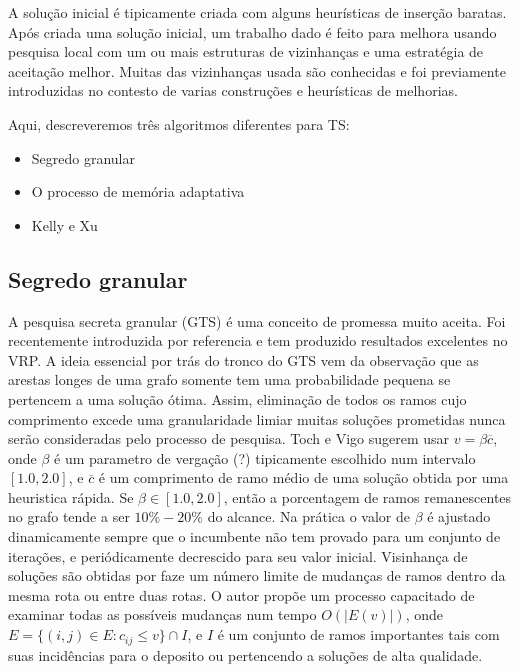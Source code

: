 \documentclass[a4paper, 12pt]{article}
\begin{document}
 A solução inicial é tipicamente criada com alguns heurísticas de inserção baratas. Após criada uma
solução inicial, um trabalho dado é feito para melhora usando pesquisa local com um ou mais
estruturas de vizinhanças e uma estratégia de aceitação melhor. Muitas das vizinhanças usada são
conhecidas e foi previamente introduzidas no contesto de varias construções e heurísticas de
melhorias.

 Aqui, descreveremos três algoritmos diferentes para TS:

\begin{itemize}
\item Segredo granular
\item O processo de memória adaptativa
\item Kelly e Xu
\end{itemize} 

\subsection{Segredo granular}

 A pesquisa secreta granular (GTS) é uma conceito de promessa muito aceita. Foi recentemente
introduzida por {\color{red} referencia} e tem produzido resultados excelentes no VRP. A ideia
essencial por trás do tronco do GTS vem da observação que as arestas longes de uma grafo somente tem
uma probabilidade pequena se pertencem a uma solução ótima. Assim, eliminação de todos os ramos cujo
comprimento excede uma granularidade limiar muitas soluções prometidas nunca serão consideradas pelo
processo de pesquisa. Toch e Vigo sugerem usar $v = \beta \overline{c}$, onde $\beta$ é um parametro
de vergação (?) tipicamente escolhido num intervalo $[1.0, 2.0]$, e $\overline{c}$ é um comprimento
de ramo médio de uma solução obtida por uma heuristica rápida. Se $\beta \in [1.0, 2.0]$, então a
porcentagem de ramos remanescentes no grafo tende a ser $10\%-20\%$ do alcance. Na prática o valor
de $\beta$ é ajustado dinamicamente sempre que o incumbente não tem provado para um conjunto de
iterações, e periódicamente decrescido para seu valor inicial. Visinhança de soluções são obtidas
por faze um número limite de mudanças de ramos dentro da mesma rota ou entre duas rotas. O autor
propõe um processo capacitado de examinar todas as possíveis mudanças num tempo $O(|E(v)|)$, onde
$E=\{(i,j) \in E: c_{ij} \leq v\} \cap I$, e $I$ é um conjunto de ramos importantes tais com suas
incidências para o deposito ou pertencendo a soluções de alta qualidade.
\end{document}
